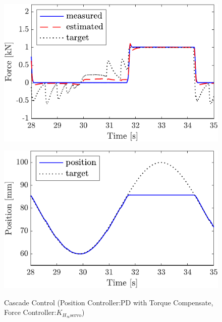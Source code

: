 \begin{figure}[t]
    \begin{minipage}{\minipageratio\hsize}
    \centering
        \includegraphics[keepaspectratio, scale = \minifigscale]{contents/IntegrationControl/figure/SECASQ/crop-FBcsqtch_JFPS4_trq_force.pdf}
        \label{fig5:crop-FBcsqtch_JFPS4_trq_force}
    \end{minipage}
    \begin{minipage}{\minipageratio\hsize}
    \centering
        \includegraphics[keepaspectratio, scale = \minifigscale]{contents/IntegrationControl/figure/SECASQ/crop-FBcsqtch_JFPS4_trq_pos.pdf}
        \label{fig5:crop-FBcsqtch_JFPS4_trq_pos}
    \end{minipage}
    \caption{Cascade Control (Position Controller:PD with Torque Compensate, Force Controller:$K_{H_\infty\mathrm{servo}}$)}  
    \label{fig5:crop-FBcsqtch_JFPS4_trq}
\end{figure}


